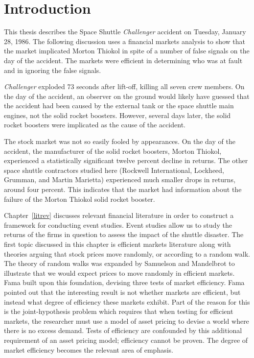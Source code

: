   \chapter{Introduction}

This thesis describes the Space Shuttle {\em Challenger} accident on Tuesday, January 28, 1986. The following discussion uses a financial markets analysis to show that the market implicated Morton Thiokol in spite of a number of false signals on the day of the accident. The markets were efficient in determining who was at fault and in ignoring the false signals.

{\em Challenger} exploded 73 seconds after lift-off, killing all seven crew members. On the day of the accident, an observer on the ground would likely have guessed that the accident had been caused by the external tank or the space shuttle main engines, not the solid rocket boosters. However, several days later, the solid rocket boosters were implicated as the cause of the accident.

The stock market was not so easily fooled by appearances. On the day of the accident, the manufacturer of the solid rocket boosters, Morton Thiokol, experienced a statistically significant twelve percent decline in returns. The other space shuttle contractors studied here (Rockwell International, Lockheed, Grumman, and Martin Marietta) experienced much smaller drops in returns, around four percent. This indicates that the market had information about the failure of the Morton Thiokol solid rocket booster.

Chapter~\ref{litrev} discusses relevant financial literature in order to construct a framework for conducting event studies. Event studies allow us to study the returns of the firms in question to assess the impact of the shuttle disaster. The first topic discussed in this chapter is efficient markets literature along with theories arguing that stock prices move randomly, or according to a random walk. The theory of random walks was expanded by Samuelson and Mandelbrot to illustrate that we would expect prices to move randomly in efficient markets. Fama built upon this foundation, devising three tests of market efficiency. Fama pointed out that the interesting result is not whether markets are efficient, but instead what degree of efficiency these markets exhibit. Part of the reason for this is the joint-hypothesis problem which requires that when testing for efficient markets, the researcher must use a model of asset pricing to devise a world where there is no excess demand. Tests of efficiency are confounded by this additional requirement of an asset pricing model; efficiency cannot be proven. The degree of market efficiency becomes the relevant area of emphasis.

